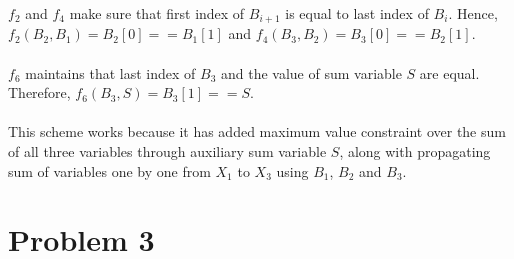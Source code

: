 \documentclass[12pt]{article}
\begin{document}
\begin{enumerate}[label=(\alph*)]
  $f_2$ and $f_4$ make sure that first index of $B_{i+1}$ is equal to last index of $B_{i}$. Hence, $f_2(B_2, B_1) = B_2[0] == B_1[1]$ and $f_4(B_3, B_2) = B_3[0] == B_2[1]$. \\ \\
  $f_6$ maintains that last index of $B_3$ and the value of sum variable $S$ are equal. Therefore, $f_6(B_3, S) = B_3[1] == S$. \\ \\
  This scheme works because it has added maximum value constraint over the sum of all three variables through auxiliary sum variable $S$, along with propagating sum of variables one by one from $X_1$ to $X_3$ using $B_1$, $B_2$ and $B_3$.
\end{enumerate}

\section*{Problem 3}
\end{document}
